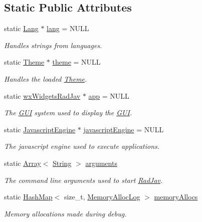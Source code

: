 \subsection*{Static Public Attributes}
\begin{DoxyCompactItemize}
\item 
static \mbox{\hyperlink{class_rad_j_a_v_1_1_lang}{Lang}} $\ast$ \mbox{\hyperlink{class_rad_j_a_v_1_1_rad_jav_ac27c2fc21e98d8961c7e98099b71c4f3}{lang}} = N\+U\+LL
\begin{DoxyCompactList}\small\item\em Handles strings from languages. \end{DoxyCompactList}\item 
static \mbox{\hyperlink{class_rad_j_a_v_1_1_theme}{Theme}} $\ast$ \mbox{\hyperlink{class_rad_j_a_v_1_1_rad_jav_ace6c4f9cb9d0d9c248986feeea31150e}{theme}} = N\+U\+LL
\begin{DoxyCompactList}\small\item\em Handles the loaded \mbox{\hyperlink{class_rad_j_a_v_1_1_theme}{Theme}}. \end{DoxyCompactList}\item 
static \mbox{\hyperlink{class_rad_j_a_v_1_1wx_widgets_rad_jav}{wx\+Widgets\+Rad\+Jav}} $\ast$ \mbox{\hyperlink{class_rad_j_a_v_1_1_rad_jav_aa7084f6f5e9bfddf213a16c06878cb36}{app}} = N\+U\+LL
\begin{DoxyCompactList}\small\item\em The \mbox{\hyperlink{namespace_rad_j_a_v_1_1_g_u_i}{G\+UI}} system used to display the \mbox{\hyperlink{namespace_rad_j_a_v_1_1_g_u_i}{G\+UI}}. \end{DoxyCompactList}\item 
static \mbox{\hyperlink{class_rad_j_a_v_1_1_javascript_engine}{Javascript\+Engine}} $\ast$ \mbox{\hyperlink{class_rad_j_a_v_1_1_rad_jav_aa80128a74f47d969173d2e7946e0ae6c}{javascript\+Engine}} = N\+U\+LL
\begin{DoxyCompactList}\small\item\em The javascript engine used to execute applications. \end{DoxyCompactList}\item 
static \mbox{\hyperlink{class_rad_j_a_v_1_1_array}{Array}}$<$ \mbox{\hyperlink{class_rad_j_a_v_1_1_string}{String}} $>$ \mbox{\hyperlink{class_rad_j_a_v_1_1_rad_jav_a8a4b1ccb076b4ffa84b285d8c1d1e050}{arguments}}
\begin{DoxyCompactList}\small\item\em The command line arguments used to start \mbox{\hyperlink{class_rad_j_a_v_1_1_rad_jav}{Rad\+Jav}}. \end{DoxyCompactList}\item 
static \mbox{\hyperlink{namespace_rad_j_a_v_a7c83af3095bdd8035fd71ff008120f08}{Hash\+Map}}$<$ size\+\_\+t, \mbox{\hyperlink{class_rad_j_a_v_1_1_memory_alloc_log}{Memory\+Alloc\+Log}} $>$ \mbox{\hyperlink{class_rad_j_a_v_1_1_rad_jav_abb9c47c4a37be67599ee136f9fbbd33e}{memory\+Allocs}}
\begin{DoxyCompactList}\small\item\em Memory allocations made during debug. \end{DoxyCompactList}\end{DoxyCompactItemize}


